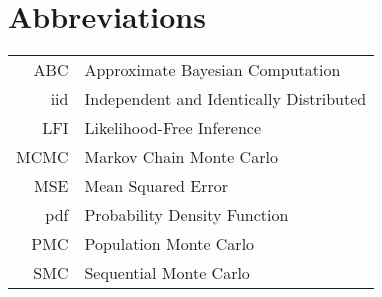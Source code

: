 \chapter*{Abbreviations}
\thispagestyle{plain}



\begin{longtable}{rl}
    ABC & Approximate Bayesian Computation \\
    iid & Independent and Identically Distributed \\
    LFI & Likelihood-Free Inference \\
    MCMC & Markov Chain Monte Carlo \\
    MSE & Mean Squared Error \\
    pdf & Probability Density Function \\
    PMC & Population Monte Carlo \\
    SMC & Sequential Monte Carlo
\end{longtable}

